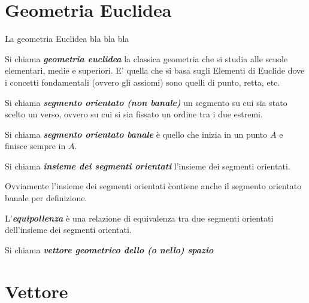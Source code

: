 \section{Geometria Euclidea}
La geometria Euclidea bla bla bla
\begin{definizione}
Si chiama \emph{\bf{geometria euclidea}} la classica geometria che si studia alle scuole elementari, medie e superiori. E' quella che si basa sugli Elementi di Euclide dove
i concetti fondamentali (ovvero gli assiomi) sono quelli di punto, retta, etc.
\end{definizione}

\begin{definizione}
Si chiama \emph{\bf{segmento orientato (non banale)}} un segmento su cui sia stato scelto un verso, ovvero su cui si sia fissato un ordine tra i due estremi. 
\end{definizione}

\begin{definizione}
Si chiama \emph{\bf{segmento orientato banale}} \`e quello che inizia in un punto $A$ e finisce sempre in $A$.
\end{definizione}

\begin{definizione}
Si chiama \emph{\bf{insieme dei segmenti orientati}} l'insieme dei segmenti orientati.
\end{definizione}

\begin{osservazione}
Ovviamente l'insieme dei segmenti orientati \`contiene anche il segmento orientato banale per definizione.
\end{osservazione}

\begin{definizione}
L'\emph{\bf{equipollenza}} \`e una relazione di equivalenza tra due segmenti orientati dell'insieme dei segmenti orientati.
\end{definizione}

\begin{definizione}
Si chiama \emph{\bf{vettore geometrico dello (o nello) spazio}}
\end{definizione}

\section{Vettore}
